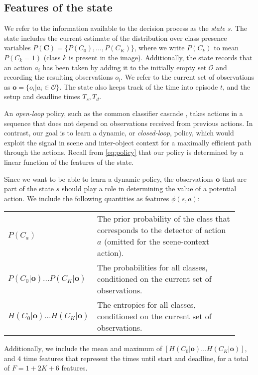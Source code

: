 \subsection{Features of the state}\label{sec:det_features}

We refer to the information available to the decision process as the \emph{state} $s$.
The state includes the current estimate of the distribution over class presence variables $P(\mathbf{C}) = \{P(C_0), \ldots, P(C_K)\}$, where we write $P(C_k)$ to mean $P(C_k=1)$ (class $k$ is present in the image).
Additionally, the state records that an action $a_i$ has been taken by adding it to the initially empty set $\mathcal{O}$ and recording the resulting observations $o_i$.
We refer to the current set of observations as $\mathbf{o} = \{o_i | a_i \in \mathcal{O}\}$.
The state also keeps track of the time into episode $t$, and the setup and deadline times $T_s,T_d$.

An \emph{open-loop} policy, such as the common classifier cascade \parencite{Viola-IJCV-2004}, takes actions in a sequence that does not depend on observations received from previous actions.
In contrast, our goal is to learn a dynamic, or \emph{closed-loop}, policy, which would exploit the signal in scene and inter-object context for a maximally efficient path through the actions.
Recall from \autoref{eq:policy} that our policy is determined by a linear function of the features of the state.

Since we want to be able to learn a dynamic policy, the observations $\mathbf{o}$ that are part of the state $s$ should play a role in determining the value of a potential action.
We include the following quantities as features $\phi(s,a)$:

\begin{tabularx}{0.8\linewidth}{p{0.23\linewidth}p{0.69\linewidth}}
$P(C_a)$ & The prior probability of the class that corresponds to the detector of action $a$ (omitted for the scene-context action).\\
$P(C_0|\mathbf{o}) \ldots P(C_K|\mathbf{o})$ & The probabilities for all classes, conditioned on the current set of observations.\\
$H(C_0|\mathbf{o}) \ldots H(C_K|\mathbf{o})$ & The entropies for all classes, conditioned on the current set of observations. \\
\end{tabularx}
Additionally, we include the mean and maximum of $[H(C_0|\mathbf{o}) \ldots H(C_K|\mathbf{o})]$, and $4$ time features that represent the times until start and deadline, for a total of $F = 1+2K+6$ features.

